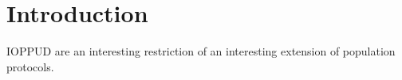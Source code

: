 \section{Introduction}
\label{sec:intro}

IOPPUD are an interesting restriction of an interesting extension of population protocols.